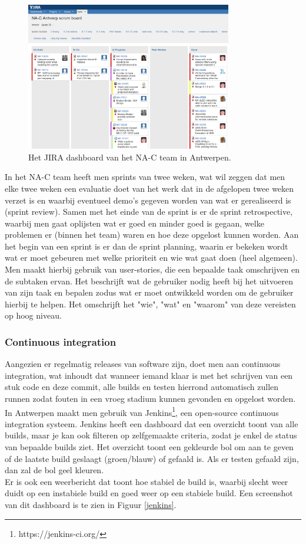 \documentclass[10pt,a4paper]{article}
\begin{document}
\begin{figure}[ht!]
\centering
\includegraphics[width=90mm]{CaptureJira.png}
\caption{Het JIRA dashboard van het NA-C team in Antwerpen.} 
\label{jira}
\end{figure}

In het NA-C team heeft men sprints van twee weken, wat wil zeggen dat men elke twee weken een evaluatie doet van het werk dat in de afgelopen twee weken verzet is en waarbij eventueel demo's gegeven worden van wat er gerealiseerd is (sprint review). Samen met het einde van de sprint is er de sprint retrospective, waarbij men gaat oplijsten wat er goed en minder goed is gegaan, welke problemen er (binnen het team) waren en hoe deze opgelost kunnen worden. Aan het begin van een sprint is er dan de sprint planning, waarin er bekeken wordt wat er moet gebeuren met welke prioriteit en wie wat gaat doen (heel algemeen). Men maakt hierbij gebruik van user-stories, die een bepaalde taak omschrijven en de subtaken ervan. Het beschrijft wat de gebruiker nodig heeft bij het uitvoeren van zijn taak en bepalen zodus wat er moet ontwikkeld worden om de gebruiker hierbij te helpen. Het omschrijft het "wie", "wat" en "waarom" van deze vereisten op hoog niveau.
\subsubsection{Continuous integration}
Aangezien er regelmatig releases van software zijn, doet men aan continuous integration, wat inhoudt dat wanneer iemand klaar is met het schrijven van een stuk code en deze commit, alle builds en testen hierrond automatisch zullen runnen zodat fouten in een vroeg stadium kunnen gevonden en opgelost worden.\\
In Antwerpen maakt men gebruik van Jenkins\footnote{https://jenkins-ci.org/}, een open-source continuous integration systeem. Jenkins heeft een dashboard dat een overzicht toont van alle builds, maar je kan ook filteren op zelfgemaakte criteria, zodat je enkel de status van bepaalde builds ziet. Het overzicht toont een gekleurde bol om aan te geven of de laatste build geslaagt (groen/blauw) of gefaald is. Als er testen gefaald zijn, dan zal de bol geel kleuren.\\
Er is ook een weerbericht dat toont hoe stabiel de build is, waarbij slecht weer duidt op een instabiele build en goed weer op een stabiele build. Een screenshot van dit dashboard is te zien in Figuur \ref{jenkins}.
\end{document}
